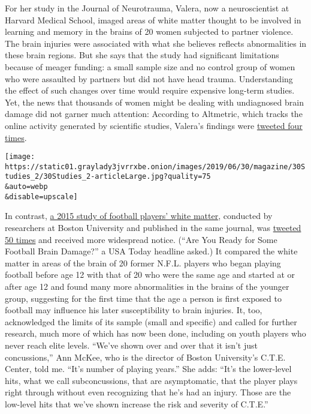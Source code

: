 For her study in the Journal of Neurotrauma, Valera, now a
neuroscientist at Harvard Medical School, imaged areas of white matter
thought to be involved in learning and memory in the brains of 20 women
subjected to partner violence. The brain injuries were associated with
what she believes reflects abnormalities in these brain regions. But she
says that the study had significant limitations because of meager
funding: a small sample size and no control group of women who were
assaulted by partners but did not have head trauma. Understanding the
effect of such changes over time would require expensive long-term
studies. Yet, the news that thousands of women might be dealing with
undiagnosed brain damage did not garner much attention: According to
Altmetric, which tracks the online activity generated by scientific
studies, Valera's findings were
\href{https://www.altmetric.com/details/43423449}{tweeted four times}.

\texttt{[image: https://static01.graylady3jvrrxbe.onion/images/2019/06/30/magazine/30Studies\_2/30Studies\_2-articleLarge.jpg?quality=75\\\&auto=webp\\\&disable=upscale]}

In contrast,
\href{https://www.liebertpub.com/doi/abs/10.1089/neu.2014.3822}{a 2015
study of football players' white matter}, conducted by researchers at
Boston University and published in the same journal, was
\href{https://www.altmetric.com/details/4308278}{tweeted 50 times} and
received more widespread notice. (``Are You Ready for Some Football
Brain Damage?'' a USA Today headline asked.) It compared the white
matter in areas of the brain of 20 former N.F.L. players who began
playing football before age 12 with that of 20 who were the same age and
started at or after age 12 and found many more abnormalities in the
brains of the younger group, suggesting for the first time that the age
a person is first exposed to football may influence his later
susceptibility to brain injuries. It, too, acknowledged the limits of
its sample (small and specific) and called for further research, much
more of which has now been done, including on youth players who never
reach elite levels. ``We've shown over and over that it isn't just
concussions,'' Ann McKee, who is the director of Boston University's
C.T.E. Center, told me. ``It's number of playing years.'' She adds:
``It's the lower-level hits, what we call subconcussions, that are
asymptomatic, that the player plays right through without even
recognizing that he's had an injury. Those are the low-level hits that
we've shown increase the risk and severity of C.T.E.''

